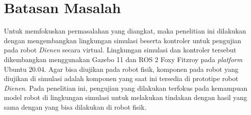 \section{Batasan Masalah}
\label{sec:batasanmasalah}

Untuk memfokuskan permasalahan yang diangkat,
  maka penelitian ini dilakukan dengan mengembangkan lingkungan simulasi beserta kontroler untuk pengujian pada robot \emph{Dienen} secara virtual.
Lingkungan simulasi dan kontroler tersebut dikembangkan menggunakan Gazebo 11 dan ROS 2 Foxy Fitzroy pada \emph{platform} Ubuntu 20.04.
Agar bisa diujikan pada robot fisik,
  komponen pada robot yang diujikan di simulasi adalah komponen yang saat ini tersedia di prototipe robot \emph{Dienen}.
Pada penelitian ini,
  pengujian yang dilakukan terfokus pada kemampuan model robot di lingkungan simulasi untuk melakukan tindakan dengan hasil yang sama dengan yang bisa dilakukan di robot fisik.

